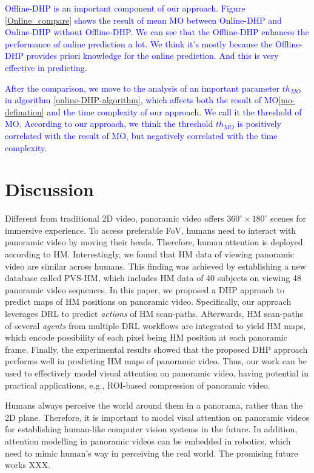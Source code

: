 \documentclass[10pt,journal,compsoc]{IEEEtran}
\begin{document}
\textcolor{blue}{Offline-DHP is an important component of our approach.
Figure \ref{Online_compare} shows the result of mean MO between Online-DHP and Online-DHP without Offline-DHP.
We can see that the Offline-DHP enhances the performance of online prediction a lot.
We think it's mostly because the Offline-DHP provides priori knowledge for the online prediction.
And this is very effective in predicting.}

\textcolor{blue}{After the comparison, we move to the analysis of an important parameter $th_{MO}$ in algorithm \ref{online-DHP-algorithm}, which affects both the result of MO\eqref{mo-defination} and the time complexity of our approach.
We call it the threshold of MO.
According to our approach, we think the threshold $th_{MO}$ is positively correlated with the result of MO, but negatively correlated with the time complexity.}



\section{Discussion}
Different from traditional 2D video, panoramic video offers $360^{\circ} \times 180^{\circ}$ scenes for immersive experience. To access preferable FoV, humans need to interact with panoramic video by moving their heads. Therefore, human attention is deployed according to HM.  Interestingly, we found that HM data of viewing panoramic video are similar across humans. This finding was achieved by establishing a new database called PVS-HM, which includes HM data of 40 subjects on viewing 48 panoramic video sequences. In this paper, we proposed a DHP approach to predict maps of HM positions on panoramic video. Specifically, our approach leverages DRL to predict \textit {actions} of HM scan-paths. Afterwards, HM scan-paths of several \textit{agents} from multiple DRL workflows are integrated to yield HM maps, which encode possibility of each pixel being HM position at each panoramic frame. Finally, the experimental results showed that the proposed DHP approach performs well in predicting HM maps of panoramic video. Thus, our work can be used to effectively model visual attention on panoramic video, having potential in practical applications, e.g., ROI-based compression of panoramic video.

Humans always perceive the world around them in a panorama, rather than the 2D plane. Therefore, it is important to model visal attention on panoramic videos for establishing human-like computer vision systems in the future. In addition, attention modelling in panoramic videos can be embedded in robotics, which need to mimic human's way in perceiving the real world. The promising future works XXX.
\end{document}
